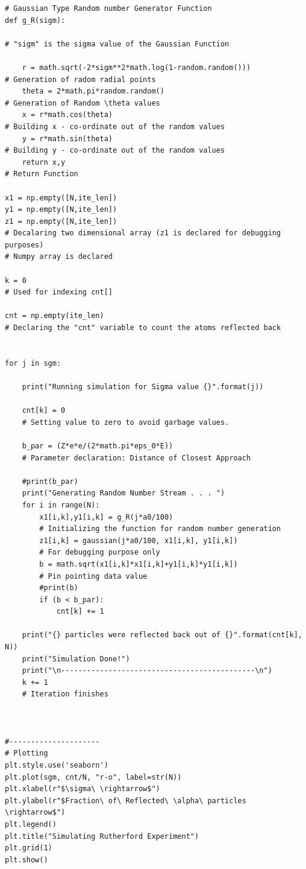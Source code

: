 \documentclass[11pt,a4paper]{article}
\begin{document}
\begin{verbatim}
# Gaussian Type Random number Generator Function
def g_R(sigm):

# "sigm" is the sigma value of the Gaussian Function
 
    r = math.sqrt(-2*sigm**2*math.log(1-random.random()))
# Generation of radom radial points
    theta = 2*math.pi*random.random()
# Generation of Random \theta values 
    x = r*math.cos(theta)
# Building x - co-ordinate out of the random values
    y = r*math.sin(theta)
# Building y - co-ordinate out of the random values
    return x,y
# Return Function

x1 = np.empty([N,ite_len])
y1 = np.empty([N,ite_len])
z1 = np.empty([N,ite_len])
# Decalaring two dimensional array (z1 is declared for debugging purposes) 
# Numpy array is declared 

k = 0
# Used for indexing cnt[] 

cnt = np.empty(ite_len)
# Declaring the "cnt" variable to count the atoms reflected back


for j in sgm:
    
    print("Running simulation for Sigma value {}".format(j))
    
    cnt[k] = 0
    # Setting value to zero to avoid garbage values.

    b_par = (Z*e*e/(2*math.pi*eps_0*E))
    # Parameter declaration: Distance of Closest Approach

    #print(b_par)
    print("Generating Random Number Stream . . . ")
    for i in range(N):
        x1[i,k],y1[i,k] = g_R(j*a0/100)
        # Initializing the function for random number generation
        z1[i,k] = gaussian(j*a0/100, x1[i,k], y1[i,k])
        # For debugging purpose only
        b = math.sqrt(x1[i,k]*x1[i,k]+y1[i,k]*y1[i,k])
        # Pin pointing data value
        #print(b)
        if (b < b_par):
            cnt[k] += 1
    
    print("{} particles were reflected back out of {}".format(cnt[k], N))
    print("Simulation Done!")
    print("\n---------------------------------------------\n")
    k += 1
    # Iteration finishes
        
            

#---------------------
# Plotting
plt.style.use('seaborn')    
plt.plot(sgm, cnt/N, "r-o", label=str(N))
plt.xlabel(r"$\sigma\ \rightarrow$")
plt.ylabel(r"$Fraction\ of\ Reflected\ \alpha\ particles \rightarrow$")
plt.legend()
plt.title("Simulating Rutherford Experiment")
plt.grid(1)
plt.show()
\end{verbatim}
\end{document}
